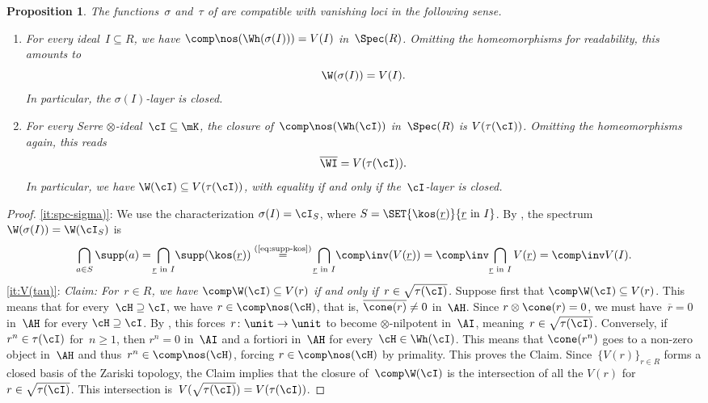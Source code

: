 \documentclass[11pt]{amsart}
\numberwithin{equation}{section} %
\theoremstyle{plain}
\newtheorem{prop}[equation]{Proposition}
\theoremstyle{definition}
\theoremstyle{remark}
\begin{document}
%
\begin{prop}
The functions~$\sigma$ and~$\tau$ of  are compatible with vanishing loci in the following sense.
\begin{enumerate}[\rm(a)]
\item
\label{it:spc-sigma)}%
For every ideal~$I\subseteq R$, we have $\comp\nos(\Wh(\sigma(I)))=V(I)$ in~$\Spec(R)$. Omitting the homeomorphisms for readability, this amounts to
%
\[
\W(\sigma(I))=V(I).
\]
%
In particular, the $\sigma(I)$-layer is closed.
%
\smallbreak
\item
\label{it:V(tau)}%
For every Serre $\otimes$-ideal~$\cI\subseteq \mK$, the closure of~$\comp\nos(\Wh(\cI))$ in~$\Spec(R)$ is $V(\tau(\cI))$. Omitting the homeomorphisms again, this reads
%
\[
\overline{\WI}=V(\tau(\cI)).
\]
%
In particular, we have $\W(\cI)\subseteq V(\tau(\cI))$, with equality if and only if the~$\cI$-layer is closed.
\end{enumerate}
\end{prop}
\begin{proof}
\eqref{it:spc-sigma)}:
We use the characterization $\sigma(I) = \cI_S$, where $S = \SET{\kos(\underline{r})}{\underline{r} \text{ in } I}$. By , the spectrum~$\W(\sigma(I))=\W(\cI_S)$ is
%
\[
\bigcap_{a\in S}\supp(a)=
\!\bigcap_{\underline{r}\textrm{ in }I}\!\supp(\kos(\underline{r}))\overset{\textrm{(\ref{eq:supp-kos})}}{=}
\!\bigcap_{\underline{r}\textrm{ in }I}\!\comp\inv(V(\underline{r}))=
\comp\inv\!\bigcap_{\underline{r}\textrm{ in }I}V(\underline{r})=
\comp\inv V(I).
\]
%
\eqref{it:V(tau)}: 
\textit{Claim: For~$r\in R$, we have $\comp\W(\cI)\subseteq V(r)$ if and only if~$r\in\sqrt{\tau(\cI)}$.}
Suppose first that $\comp\W(\cI)\subseteq V(r)$. This means that for every~$\cH\supseteq \cI$, we have $r\in\comp\nos(\cH)$, that is, $\overline{\cone(r)}\neq0$ in~$\AH$. Since $r\otimes \cone(r)=0$, we must have~$\overline{r}=0$ in~$\AH$ for every $\cH\supseteq\cI$. By , this forces~$r\colon \unit\to \unit$ to become $\otimes$-nilpotent in~$\AI$, meaning~$r\in\sqrt{\tau(\cI)}$. Conversely, if~$r^n\in\tau(\cI)$ for~$n\ge 1$, then $r^n=0$ in~$\AI$ and a fortiori in~$\AH$ for every~$\cH\in \Wh(\cI)$. This means that $\cone(r^n)$ goes to a non-zero object in~$\AH$ and thus~$r^n \in \comp \nos(\cH)$, forcing $r \in \comp\nos(\cH)$ by primality.
This proves the Claim. Since~$\{V(r)\}_{r\in R}$ forms a closed basis of the Zariski topology, the Claim implies that the closure of~$\comp\W(\cI)$ is the intersection of all the $V(r)$ for~$r\in\sqrt{\tau(\cI)}$. This intersection is~$V(\sqrt{\tau(\cI)})=V(\tau(\cI))$.
\end{proof}
\end{document}
